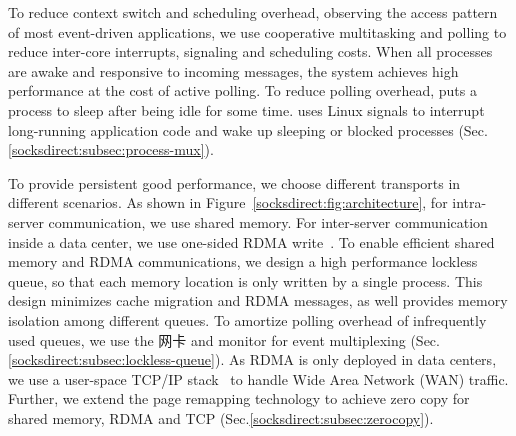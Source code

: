 To reduce context switch and scheduling overhead, observing the access pattern of most event-driven applications, we use cooperative multitasking and polling to reduce inter-core interrupts, signaling and scheduling costs. When all processes are awake and responsive to incoming messages, the system achieves high performance at the cost of active polling. To reduce polling overhead, \sys puts a process to sleep after being idle for some time. \sys uses Linux signals to interrupt long-running application code and wake up sleeping or blocked processes (Sec.\ref{socksdirect:subsec:process-mux}). 

 To provide persistent good performance, we choose different transports in different scenarios. As shown in Figure~\ref{socksdirect:fig:architecture}, for intra-server communication, we use shared memory. For inter-server communication inside a data center, we use one-sided RDMA write~\cite{mitchell2013using,kaminsky2016design}. To enable efficient shared memory and RDMA communications, we design a high performance lockless queue, so that each memory location is only written by a single process. This design minimizes cache migration and RDMA messages, as well provides memory isolation among different queues. To amortize polling overhead of infrequently used queues, we use the 网卡 and monitor for event multiplexing (Sec.\ref{socksdirect:subsec:lockless-queue}). As RDMA is only deployed in data centers, we use a user-space TCP/IP stack~\cite{dunkels2001design} to handle Wide Area Network (WAN) traffic. Further, we extend the page remapping technology to achieve zero copy for shared memory, RDMA and TCP (Sec.\ref{socksdirect:subsec:zerocopy}).
